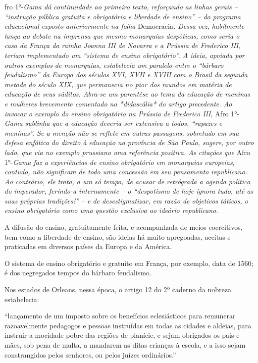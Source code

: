 \begin{didascalia}
fro 1°-\emph{Gama dá continuidade ao primeiro texto, reforçando as
linhas gerais -- ``instrução pública gratuita e obrigatória e liberdade
de ensino'' -- do programa educacional exposto anteriormente na folha}
Democracia\emph{. Dessa vez, habilmente lança ao debate na imprensa que
mesmo monarquias despóticas, como seria o caso da França da rainha
Joanna III de Navarra e a Prússia de Frederico III, teriam implementado
um ``sistema de ensino obrigatório''. A ideia, apoiada por outros exemplos
de monarquias, estabelecia um paralelo entre o ``bárbaro feudalismo'' da
Europa dos séculos XVI, XVII e XVIII com o Brasil da segunda metade do
século XIX, que permanecia no pior dos mundos em matéria de educação de
seus súditos. Abra-se um parentêse ao tema da educação de meninas e
mulheres brevemente comentado na *didascália* do artigo precedente. Ao
invocar o exemplo do ensino obrigatório na Prússia de Frederico III,}
Afro 1°-\emph{Gama sublinha que a educação deveria ser extensiva a
todos, ``rapazes e meninas''. Se a menção não se reflete em outras
passagens, sobretudo em sua defesa enfática do direito à educação na
província de São Paulo, sugere, por outro lado, que via no exemplo
prussiano uma referência positiva. As citações que} Afro 1°-\emph{Gama
faz a experiências de ensino obrigatório em monarquias europeias,
contudo, não significam de todo uma concessão em seu pensamento
republicano. Ao contrário, ele trata, a um só tempo, de acusar de
retrógrada a agenda política do imperador, ferindo-a internamente -- o
``despotismo de hoje ignora tudo, até as suas próprias tradições!'' -- e
de desestigmatizar, em razão de objetivos táticos, o ensino obrigatório
como uma questão exclusiva ao ideário republicano.}
\end{didascalia}

\asterisc{}

A difusão do ensino, gratuitamente feita, e acompanhada de meios
coercitivos, bem como a liberdade de ensino, são ideias há muito
apregoadas, aceitas e praticadas em diversos países da Europa e da
América.

O sistema de ensino obrigatório e gratuito em França, por exemplo, data
de 1560; é dos negregados tempos do bárbaro feudalismo.

Nos estados de Orleans, nessa época, o artigo 12 do 2º caderno da
nobreza estabelecia:

``lançamento de um imposto sobre os benefícios eclesiásticos para
remunerar razoavelmente pedagogos e pessoas instruídas em todas as
cidades e aldeias, para instruir a mocidade pobre das regiões de
planície, e sejam obrigados os pais e mães, sob pena de multa, a
mandarem as ditas crianças à escola, e a isso sejam constrangidos pelos
senhores, ou pelos juízes ordinários.''


